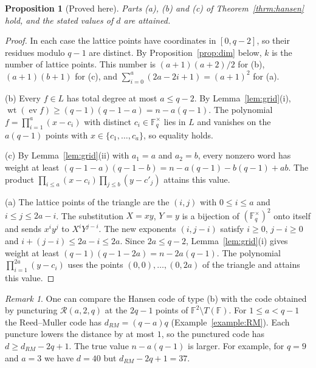 \documentclass[12pt,letterpaper]{article}
\numberwithin{equation}{section}
\newtheorem{proposition}[theorem]{Proposition}
\theoremstyle{definition}
\theoremstyle{remark}
\newtheorem{remark}[theorem]{Remark}
\DeclareMathOperator{\wt}{wt}
\DeclareMathOperator{\ev}{ev}
\newcommand{\F}{\mathbb{F}}
\newcommand{\Fqs}{\mathbb{F}_q^{\times}}
\newcommand{\RM}{\mathcal{R}}
\begin{document}
\begin{proposition}[Proved here]\label{prop:hansenabc}
Parts (a), (b) and (c) of Theorem~\ref{thrm:hansen} hold, and the stated
values of $d$ are attained.
\end{proposition}

\begin{proof}
In each case the lattice points have coordinates in $[0,q-2]$, so their
residues modulo $q-1$ are distinct. By Proposition~\ref{prop:dim} below, $k$
is the number of lattice points. This number is $(a+1)(a+2)/2$ for (b),
$(a+1)(b+1)$ for (c), and $\sum_{i=0}^{a}(2a-2i+1)=(a+1)^2$ for (a).

(b) Every $f\in L$ has total degree at most $a\le q-2$. By
Lemma~\ref{lem:grid}(i), $\wt(\ev f)\ge(q-1)(q-1-a)=n-a(q-1)$. The polynomial
$f=\prod_{i=1}^{a}(x-c_i)$ with distinct $c_i\in\Fqs$ lies in $L$ and vanishes
on the $a(q-1)$ points with $x\in\{c_1,\dots,c_a\}$, so equality holds.

(c) By Lemma~\ref{lem:grid}(ii) with $a_1=a$ and $a_2=b$, every nonzero word has
weight at least $(q-1-a)(q-1-b)=n-a(q-1)-b(q-1)+ab$. The product
$\prod_{i\le a}(x-c_i)\prod_{j\le b}(y-c'_j)$ attains this value.

(a) The lattice points of the triangle are the $(i,j)$ with $0\le i\le a$ and
$i\le j\le2a-i$. The substitution $X=xy$, $Y=y$ is a bijection of
$(\Fqs)^2$ onto itself and sends $x^iy^j$ to $X^iY^{j-i}$. The new exponents
$(i,j-i)$ satisfy $i\ge0$, $j-i\ge0$ and $i+(j-i)\le2a-i\le2a$. Since
$2a\le q-2$, Lemma~\ref{lem:grid}(i) gives weight at least
$(q-1)(q-1-2a)=n-2a(q-1)$. The polynomial $\prod_{i=1}^{2a}(y-c_i)$ uses the
points $(0,0),\dots,(0,2a)$ of the triangle and attains this value.
\end{proof}

\begin{remark}\label{rem:RMcompare}
One can compare the Hansen code of type (b) with the code obtained by
puncturing $\RM(a,2,q)$ at the $2q-1$ points of $\F^2\setminus T(\F)$. For
$1\le a<q-1$ the Reed--Muller code has $d_{RM}=(q-a)q$
(Example~\ref{example:RM}). Each puncture lowers the distance by at most $1$,
so the punctured code has $d\ge d_{RM}-2q+1$. The true value $n-a(q-1)$ is
larger. For example, for $q=9$ and $a=3$ we have $d=40$ but
$d_{RM}-2q+1=37$.
\end{remark}
\end{document}
